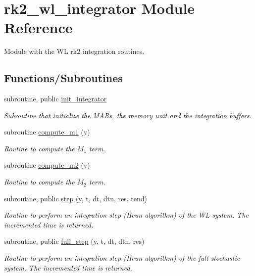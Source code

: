 \hypertarget{namespacerk2__wl__integrator}{}\section{rk2\+\_\+wl\+\_\+integrator Module Reference}
\label{namespacerk2__wl__integrator}


Module with the WL rk2 integration routines.  


\subsection*{Functions/\+Subroutines}
\begin{DoxyCompactItemize}
\item 
subroutine, public \hyperlink{namespacerk2__wl__integrator_a1ae65ef720c7776933024a7f884876b4}{init\+\_\+integrator}
\begin{DoxyCompactList}\small\item\em Subroutine that initialize the M\+A\+Rs, the memory unit and the integration buffers. \end{DoxyCompactList}\item 
subroutine \hyperlink{namespacerk2__wl__integrator_a9dc90edbd67b31409dcf3b35de448c8b}{compute\+\_\+m1} (y)
\begin{DoxyCompactList}\small\item\em Routine to compute the $M_1$ term. \end{DoxyCompactList}\item 
subroutine \hyperlink{namespacerk2__wl__integrator_ac4818fb05d425a8dc74295ec56d16cb4}{compute\+\_\+m2} (y)
\begin{DoxyCompactList}\small\item\em Routine to compute the $M_2$ term. \end{DoxyCompactList}\item 
subroutine, public \hyperlink{namespacerk2__wl__integrator_a87232dd593964f76b9cc7f36eeba25a3}{step} (y, t, dt, dtn, res, tend)
\begin{DoxyCompactList}\small\item\em Routine to perform an integration step (Heun algorithm) of the WL system. The incremented time is returned. \end{DoxyCompactList}\item 
subroutine, public \hyperlink{namespacerk2__wl__integrator_ac5c14d277e5def9b5dfcaa41fbd0b7ab}{full\+\_\+step} (y, t, dt, dtn, res)
\begin{DoxyCompactList}\small\item\em Routine to perform an integration step (Heun algorithm) of the full stochastic system. The incremented time is returned. \end{DoxyCompactList}\end{DoxyCompactItemize}
